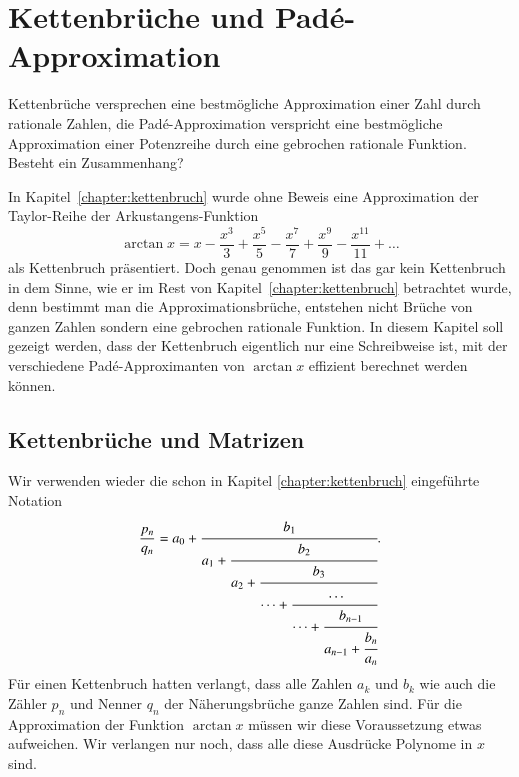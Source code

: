 %
%
%
\chapter{Kettenbrüche und Padé-Approximation\label{chapter:arctan}}
\rhead{}
\begin{refsection}

{\parindent0pt
Kettenbrüche} versprechen eine bestmögliche Approximation einer Zahl durch
rationale Zahlen, die Padé-Approximation verspricht eine bestmögliche
Approximation einer Potenzreihe durch eine gebrochen rationale Funktion.
Besteht ein Zusammenhang?

In Kapitel~\ref{chapter:kettenbruch} wurde ohne Beweis eine Approximation der 
Taylor-Reihe der Arkustangens-Funktion
\begin{equation}
\arctan x
=
x-\frac{x^3}{3}+\frac{x^5}{5}-\frac{x^7}{7}+\frac{x^9}{9}-\frac{x^{11}}{11}
+\dots
\label{arctan:arctan}
\end{equation}
als Kettenbruch präsentiert.
Doch genau genommen ist das gar kein Kettenbruch in dem Sinne, wie er
im Rest von Kapitel~\ref{chapter:kettenbruch} betrachtet wurde, denn
bestimmt man die Approximationsbrüche, entstehen nicht Brüche von ganzen
Zahlen sondern eine gebrochen rationale Funktion.
In diesem Kapitel soll gezeigt werden, dass der Kettenbruch eigentlich
nur eine Schreibweise ist, mit der verschiedene Padé-Approximanten von
$\arctan x$ effizient berechnet werden können.

\section{Kettenbrüche und Matrizen
\label{arctan:section:matrizen}}
Wir verwenden wieder die schon in Kapitel \ref{chapter:kettenbruch}
eingeführte Notation
\[
\frac{p_n}{q_n}
=
a_0 +
\cfrac{b_1}{
a_1+\cfrac{b_2}{
a_2+\cfrac{b_3}{
\dots+\cfrac{\dots}{\dots+\cfrac{b_{n-1}}{a_{n-1}+\cfrac{b_n}{a_n}}}}}}.
\]
Für einen Kettenbruch hatten verlangt, dass alle Zahlen $a_k$ und $b_k$ 
wie auch die Zähler $p_n$ und Nenner $q_n$ der Näherungsbrüche
ganze Zahlen sind.
Für die Approximation der Funktion $\arctan x$ müssen wir
diese Voraussetzung etwas aufweichen.
Wir verlangen nur noch, dass alle diese Ausdrücke Polynome in $x$ sind.


\end{refsection}
